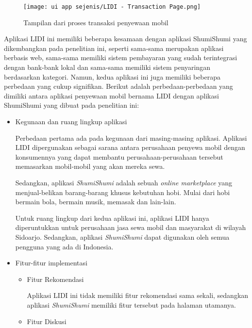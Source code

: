 \documentclass[a4paper]{article}
\begin{document}
\begin{itemize}
\begin{enumerate}
        \begin{figure}[h]
            \centering
            \texttt{[image: ui app sejenis/LIDI - Transaction Page.png]}
            \caption{Tampilan dari proses transaksi penyewaan mobil}
        \end{figure}
    
        Aplikasi LIDI ini memiliki beberapa kesamaan dengan aplikasi ShumiShumi yang dikembangkan pada penelitian ini, seperti sama-sama merupakan aplikasi berbasis web, sama-sama memiliki sistem pembayaran yang sudah terintegrasi dengan bank-bank lokal dan sama-sama memiliki sistem penyaringan berdasarkan kategori. Namun, kedua aplikasi ini juga memiliki beberapa perbedaan yang cukup signifikan. Berikut adalah perbedaan-perbedaan yang dimiliki antara aplikasi penyewaan mobil bernama LIDI dengan aplikasi ShumiShumi yang dibuat pada penelitian ini:
    
        \begin{itemize}
            \item Kegunaan dan ruang lingkup aplikasi
    
            Perbedaan pertama ada pada kegunaan dari masing-masing aplikasi. Aplikasi LIDI dipergunakan sebagai sarana antara perusahaan penyewa mobil dengan konsumennya yang dapat membantu perusahaan-perusahaan tersebut memasarkan mobil-mobil yang akan mereka sewa.
    
            Sedangkan, aplikasi \textit{ShumiShumi} adalah sebuah \textit{online marketplace} yang menjual-belikan barang-barang khusus kebutuhan hobi. Mulai dari hobi bermain bola, bermain musik, memasak dan lain-lain.
    
            Untuk ruang lingkup dari kedua aplikasi ini, aplikasi LIDI hanya diperuntukkan untuk perusahaan jasa sewa mobil dan masyarakat di wilayah Sidoarjo. Sedangkan, aplikasi \textit{ShumiShumi} dapat digunakan oleh semua pengguna yang ada di Indonesia.
    
            \item Fitur-fitur implementasi
    
            \begin{itemize}
                \item Fitur Rekomendasi
    
                Aplikasi LIDI ini tidak memiliki fitur rekomendasi sama sekali, sedangkan aplikasi \textit{ShumiShumi} memiliki fitur tersebut pada halaman utamanya.
    
                \item Fitur Diskusi
    

\end{itemize}
\end{itemize}
\end{enumerate}
\end{itemize}
\end{document}
